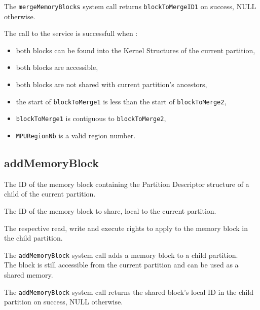 \documentclass[10pt,a4paper,titlepage]{refart}
\begin{document}
The \texttt{mergeMemoryBlocks} system call returns \texttt{blockToMergeID1} on success, NULL otherwise.

The call to the service is successfull when :
\begin{itemize}
    \item both blocks can be found into the Kernel Structures of the current partition,
    \item both blocks are accessible,
    \item both blocks are not shared with current partition's ancestors,
    \item the start of \texttt{blockToMerge1} is less than the start of \texttt{blockToMerge2},
    \item \texttt{blockToMerge1} is contiguous to \texttt{blockToMerge2},
    \item \texttt{MPURegionNb} is a valid region number.
\end{itemize}

\subsection{addMemoryBlock}
The ID of the memory block containing the Partition Descriptor structure of a child of the current partition.

The ID of the memory block to share, local to the current partition.

The respective read, write and execute rights to apply to the memory block in the child partition.

\medskip
The \texttt{addMemoryBlock} system call adds a memory block to a child partition.\\
The block is still accessible from the current partition and can be used as a shared memory.

The \texttt{addMemoryBlock} system call returns the shared block's local ID in the child partition on success, NULL otherwise.
\end{document}
